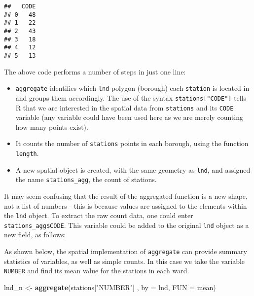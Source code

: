 \documentclass[]{article}
\newenvironment{Shaded}{}{}
\newcommand{\KeywordTok}[1]{\textcolor[rgb]{0.00,0.44,0.13}{\textbf{{#1}}}}
\newcommand{\DataTypeTok}[1]{\textcolor[rgb]{0.56,0.13,0.00}{{#1}}}
\newcommand{\StringTok}[1]{\textcolor[rgb]{0.25,0.44,0.63}{{#1}}}
\newcommand{\NormalTok}[1]{{#1}}
\begin{document}
\begin{verbatim}
##   CODE
## 0   48
## 1   22
## 2   43
## 3   18
## 4   12
## 5   13
\end{verbatim}

The above code performs a number of steps in just one line:

\begin{itemize}
\itemsep1pt\parskip0pt
\item
  \texttt{aggregate} identifies which \texttt{lnd} polygon (borough)
  each \texttt{station} is located in and groups them accordingly. The
  use of the syntax \texttt{stations{[}"CODE"{]}} tells R that we are
  interested in the spatial data from \texttt{stations} and its
  \texttt{CODE} variable (any variable could have been used here as we
  are merely counting how many points exist).
\item
  It counts the number of \texttt{stations} points in each borough,
  using the function \texttt{length}.
\item
  A new spatial object is created, with the same geometry as
  \texttt{lnd}, and assigned the name \texttt{stations\_agg}, the count
  of stations.
\end{itemize}

It may seem confusing that the result of the aggregated function is a
new shape, not a list of numbers - this is because values are assigned
to the elements within the \texttt{lnd} object. To extract the raw count
data, one could enter \texttt{stations\_agg\$CODE}. This variable could
be added to the original \texttt{lnd} object as a new field, as follows:

\begin{Shaded}
\end{Shaded}

As shown below, the spatial implementation of \texttt{aggregate} can
provide summary statistics of variables, as well as simple counts. In
this case we take the variable \texttt{NUMBER} and find its mean value
for the stations in each ward.

\begin{Shaded}
\begin{Highlighting}[]
\NormalTok{lnd_n <-}\StringTok{ }\KeywordTok{aggregate}\NormalTok{(stations[}\StringTok{"NUMBER"}\NormalTok{] , }\DataTypeTok{by =} \NormalTok{lnd, }\DataTypeTok{FUN =} \NormalTok{mean)}
\end{Highlighting}
\end{Shaded}
\end{document}
